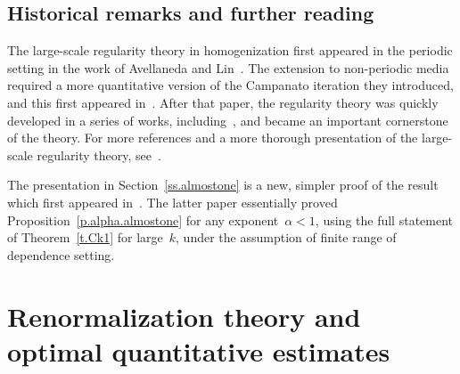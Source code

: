 \documentclass[11pt,twoside]{article} %
\numberwithin{equation}{section}
\theoremstyle{definition}
\begin{document}
\subsection*{Historical remarks and further reading}

The large-scale regularity theory in homogenization first appeared in the periodic setting in the work of Avellaneda and Lin~\cite{AL1,AL2,AL3}. The extension to non-periodic media required a more quantitative version of the Campanato iteration they introduced, and this first appeared in~\cite{AS}. After that paper, the regularity theory was quickly developed in a series of works, including~\cite{GNO3,FO,AKM1,AKM,AKMBook}, and became an important cornerstone of the theory. For more references and a more thorough presentation of the large-scale regularity theory, see~\cite[Chapter 3]{AKMBook}. 

\smallskip

The presentation in Section~\ref{ss.almostone} is a new, simpler proof of the result which first appeared in~\cite{AKM1}. The latter paper essentially proved Proposition~\ref{p.alpha.almostone} for any exponent~$\alpha < 1$, using the full statement of Theorem~\ref{t.Ck1} for large~$k$, under the assumption of finite range of dependence setting. 



\section{Renormalization theory and optimal quantitative estimates}
\label{s.renormalization}
\end{document}
